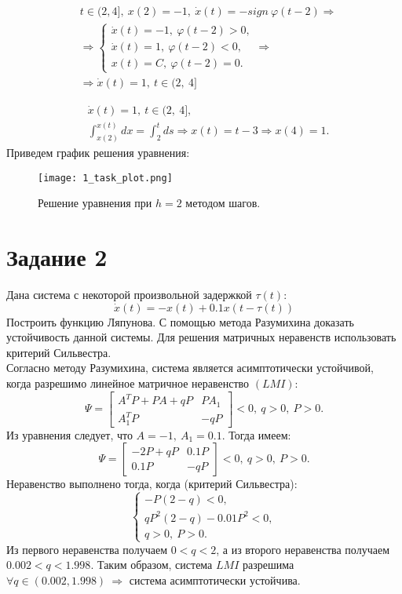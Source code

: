 \documentclass[12pt]{article}
\begin{document}
\begin{equation*}
    \begin{split}
        & t \in (2, 4], \ x(2) = -1, \ \dot{x}(t) = -sign \ \varphi(t-2) \Rightarrow \\
        & \Rightarrow \begin{cases} \dot{x}(t) = -1, \ \varphi(t-2) > 0, \\ \dot{x}(t) = 1, \ \varphi(t-2) < 0, \\ x(t) = C, \ \varphi(t-2) = 0. \end{cases} \Rightarrow \\
        & \Rightarrow \dot{x}(t) = 1, \ t \in (2, \ 4] 
    \end{split}
\end{equation*}

\begin{equation*}
    \begin{split}
        & \dot{x}(t) = 1, \ t \in (2, \ 4], \\
        & \int_{x(2)}^{x(t)} dx = \int_2^t ds \Rightarrow x(t) = t-3 \Rightarrow x(4)=1.
    \end{split}
\end{equation*}
Приведем график решения уравнения:
\begin{figure}[H]
    \centering
    \texttt{[image: 1\_task\_plot.png]}
    \caption{Решение уравнения при $h = 2$ методом шагов.}
    \label{fig:1_task_plot}
\end{figure}

\section*{Задание 2}
Дана система с некоторой произвольной задержкой $\tau(t)$:
\[
    \dot{x}(t) = -x(t)+0.1x(t-\tau(t))
\]
Построить функцию Ляпунова. С помощью метода Разумихина доказать устойчивость данной системы. Для решения матричных неравенств использовать критерий Сильвестра. \ 
\ \\
Согласно методу Разумихина, система является асимптотически устойчивой, когда разрешимо линейное матричное неравенство $(LMI)$:
\[
    \Psi = \begin{bmatrix}
        A^TP + PA + qP & PA_1 \\
        A_1^TP & -qP
    \end{bmatrix} < 0, \ q>0, \ P>0.
\]
Из уравнения следует, что $A=-1, \ A_1=0.1$. Тогда имеем:
\[
    \Psi = \begin{bmatrix}
        -2P+qP & 0.1P \\
        0.1P & -qP
    \end{bmatrix} < 0, \ q>0, \ P>0.
\]
Неравенство выполнено тогда, когда (критерий Сильвестра):
\[
    \begin{cases}
        -P(2-q) < 0, \\
        qP^2(2-q)-0.01P^2 < 0, \\
        q>0, \ P>0.
    \end{cases}
\]
Из первого неравенства получаем $0 < q < 2$, а из второго неравенства получаем $0.002 < q < 1.998$. Таким образом, система $LMI$ разрешима $\forall q \in (0.002, 1.998) \ \Rightarrow$ система асимптотически устойчива.
\end{document}
